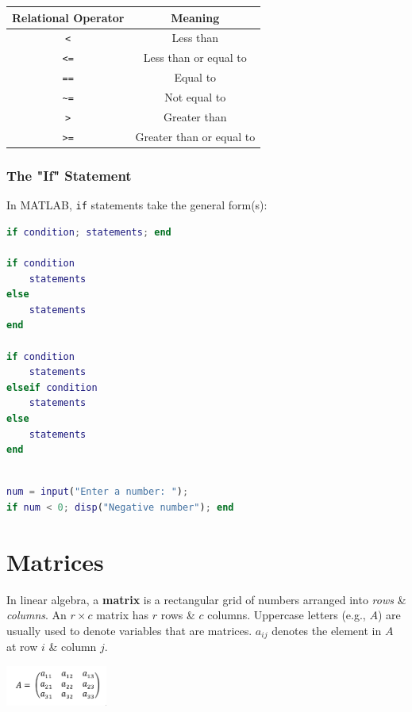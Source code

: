 \documentclass[11pt]{article}
\begin{document}
\begin{center}
\begin{tabular}{ |c|c| } 
    \hline
    \textbf{Relational Operator} & \textbf{Meaning} \\ 
    \hline
    \verb|<|    & Less than                 \\ 
    \hline 
    \verb|<=|   & Less than or equal to     \\ 
    \hline 
    \verb|==|   & Equal to                  \\
    \hline 
    \verb|~=|   & Not equal to              \\ 
    \hline 
    \verb|>|    & Greater than              \\
    \hline 
    \verb|>=|   & Greater than or equal to  \\
    \hline
\end{tabular}
\end{center}

\subsubsection{The "If" Statement} 
In MATLAB, \verb|if| statements take the general form(s):
\begin{lstlisting}[language=MATLAB]
if condition; statements; end 

if condition
    statements
else
    statements
end

if condition
    statements
elseif condition
    statements 
else 
    statements
end
    
\end{lstlisting}

\begin{lstlisting}[language=MATLAB]
num = input("Enter a number: ");
if num < 0; disp("Negative number"); end
\end{lstlisting}

\section{Matrices}
In linear algebra, a \textbf{matrix} is a rectangular grid of numbers arranged into \textit{rows} \& \textit{columns}. 
An $r \times c$ matrix has $r$ rows \& $c$ columns. 
Uppercase letters (e.g., $A$) are usually used to denote variables that are matrices. 
$a_{ij}$ denotes the element in $A$ at row $i$ \& column $j$. 

\begin{center}
    \includegraphics[width=0.25\textwidth]{matrix.png}
\end{center}
\end{document}
